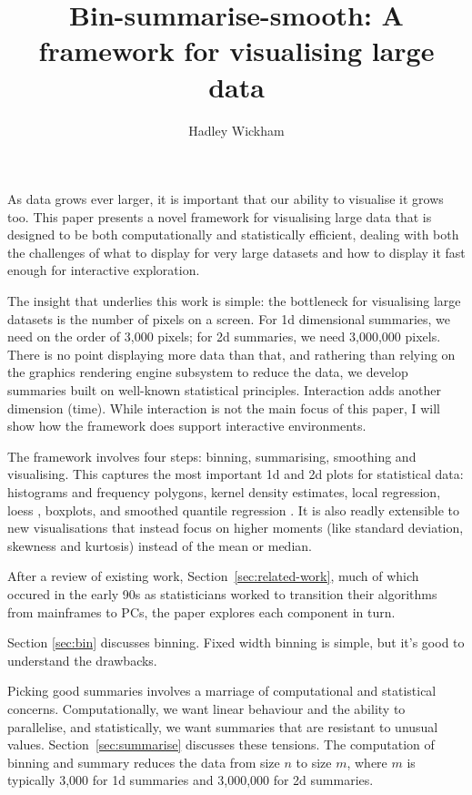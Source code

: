 \documentclass[journal]{vgtc}                %
\title{Bin-summarise-smooth: A framework for visualising large data}
\author{Hadley Wickham}
\begin{document}

\maketitle

As data grows ever larger, it is important that our ability to visualise it grows too. This paper presents a novel framework for visualising large data that is designed to be both computationally and statistically efficient, dealing with both the challenges of what to display for very large datasets and how to display it fast enough for interactive exploration.

The insight that underlies this work is simple: the bottleneck for visualising large datasets is the number of pixels on a screen. For 1d dimensional summaries, we need on the order of 3,000 pixels; for 2d summaries, we need 3,000,000 pixels. There is no point displaying more data than that, and rathering than relying on the graphics rendering engine subsystem to reduce the data, we develop summaries built on well-known statistical principles. Interaction adds another dimension (time). While interaction is not the main focus of this paper, I will show how the framework does support interactive environments.

The framework involves four steps: binning, summarising, smoothing and visualising. This captures the most important 1d and 2d plots for statistical data: histograms and frequency polygons, kernel density estimates, local regression, loess \citep{cleveland:1979}, boxplots, and smoothed quantile regression \citep{koenker:2005}. It is also readly extensible to new visualisations that instead focus on higher moments (like standard deviation, skewness and kurtosis) instead of the mean or median.

After a review of existing work, Section~\ref{sec:related-work}, much of which occured in the early 90s as statisticians worked to transition their algorithms from mainframes to PCs, the paper explores each component in turn.

Section \ref{sec:bin} discusses binning. Fixed width binning is simple, but it's good to understand the drawbacks.

Picking good summaries involves a marriage of computational and statistical  concerns. Computationally, we want linear behaviour and the ability to parallelise, and statistically, we want summaries that are resistant to unusual values. Section~\ref{sec:summarise} discusses these tensions. The computation of binning and summary reduces the data from size $n$ to size $m$, where $m$ is typically 3,000 for 1d summaries and 3,000,000 for 2d summaries.
\end{document}
